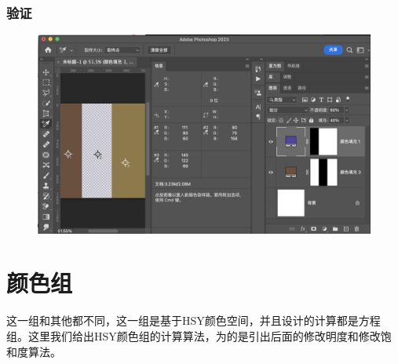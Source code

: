 \subsection{ 验证}

\begin{figure}[h!]
	\centering
	\includegraphics[width=\linewidth]{figure/divide}
	\caption{}
	\label{fig:divide}
\end{figure}
%
%

\chapter{颜色组}
\begin{introduction}
\item 这一组和其他都不同，这一组是基于HSY颜色空间，并且设计的计算都是方程组。这里我们给出HSY颜色组的计算算法，为的是引出后面的修改明度和修改饱和度算法。
\end{introduction}

